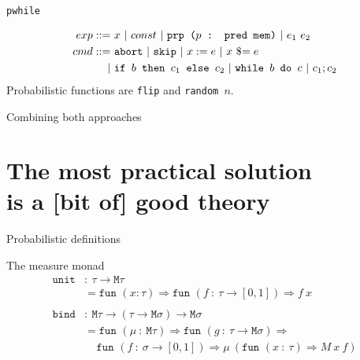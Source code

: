 \documentclass{beamer}
\begin{document}
\begin{frame}{\texttt{pwhile}}
  
\begin{align*}
  exp ::=~& x ~\vert ~ const ~\vert ~ \texttt{prp ($p$ : pred mem)}~\vert ~ e_1\ e_2\\
  cmd ::=~& \texttt{abort} ~\vert ~ \texttt{skip} ~\vert ~ x := e ~\vert ~ x\ \$\hspace{-0.25em}= e\\
  \vert ~ & \texttt{if } b \texttt{ then } c_1 \texttt{ else } c_2 ~\vert ~
            \texttt{while } b \texttt{ do } c ~\vert ~ c_1 ; c_2
\end{align*}
Probabilistic functions are \texttt{flip} and \texttt{random $n$}. 
\end{frame}


\begin{frame}{Combining both approaches}
  \begin{center}
  \end{center}
\end{frame}


\section{The most practical solution\\
is a [bit of] good theory}


\begin{frame}{Probabilistic definitions}
  
\end{frame}


\begin{frame}{The measure monad}
  \begin{align*}
    \texttt{unit} & :~ \tau\to\texttt{M}\tau\\
                  & = \texttt{fun }(x:\tau)\Rightarrow
                    \texttt{fun }(f~:~\tau\to[0,1])\Rightarrow f~x\\
    \\
    \texttt{bind} & :~\texttt{M}\tau\to(\tau\to\texttt{M}\sigma)\to\texttt{M}\sigma\\
                  & = \texttt{fun }(\mu~:~\texttt{M}\tau)\Rightarrow \texttt{fun }
                    (g~:~\tau\to\texttt{M}\sigma) \Rightarrow\\
                  & ~~~~~\texttt{fun }(f~:~\sigma\to[0,1])\Rightarrow \mu~ (\texttt{fun
                    }(x~:~\tau)\Rightarrow M~x~f)
  \end{align*}
\end{frame}
\end{document}
